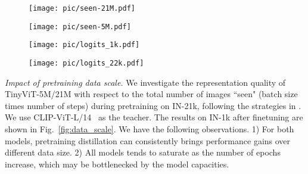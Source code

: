 \documentclass[runningheads]{llncs}
\begin{document}
\begin{figure*}[t]
  \vspace{-2mm}
  \centering
  
  \begin{subfigure}{0.49\linewidth}
    \texttt{[image: pic/seen-21M.pdf]}
    \label{fig:data_scale_1}
  \end{subfigure}
  \hfill
  \begin{subfigure}{0.49\linewidth}
    \texttt{[image: pic/seen-5M.pdf]}
    \label{fig:data_scale_2}
  \end{subfigure}
  
\caption{Comparison on pretrained TinyViT-21M/5M over training data size.}
  \label{fig:data_scale}
  \vspace{-4mm}
\end{figure*}


\begin{figure*}[t]
  \centering
  
  \begin{subfigure}{0.49\linewidth}
    \texttt{[image: pic/logits\_1k.pdf]}
    \label{fig:topk-1k}
  \end{subfigure}
  \hfill
  \begin{subfigure}{0.49\linewidth}
    \texttt{[image: pic/logits\_22k.pdf]}
    \label{fig:topk-21k}
  \end{subfigure}
  
\caption{The accuracy on IN-1k and storage cost of TinyViT-21M along different saved logits . \textbf{Left: } distill TinyViT-21M on IN-1k
  \textbf{Right: } distill TinyViT-21M on IN-21k then finetune it on IN-1k.
  }
  \label{fig:topk}
  \vspace{-4mm}
\end{figure*}

\textit{Impact of pretraining data scale.}
We investigate the representation quality of TinyViT-5M/21M with respect to the total number of images ``seen" (batch size times number of steps) during pretraining on IN-21k, following the strategies in \cite{scalevit}. We use CLIP-ViT-L/14~\cite{clip,ViT} as the teacher. The results on IN-1k after finetuning are shown in Fig.~\ref{fig:data_scale}. We have the following observations. 1) For both models, pretraining distillation can consistently brings performance gains over different data size. 
2) All models tends to saturate as the number of epochs increase, which may be bottlenecked by the model capacities. 
\end{document}
